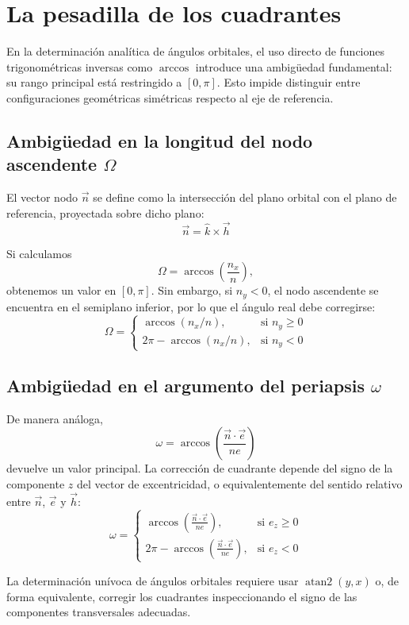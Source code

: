 \section{La pesadilla de los cuadrantes}
En la determinación analítica de ángulos orbitales, el uso directo de funciones trigonométricas inversas como \(\arccos\) introduce una ambigüedad fundamental: su rango principal está restringido a \([0,\pi]\). Esto impide distinguir entre configuraciones geométricas simétricas respecto al eje de referencia.

\subsection{Ambigüedad en la longitud del nodo ascendente \texorpdfstring{$\Omega$}{Omega}}
El vector nodo \(\vec{n}\) se define como la intersección del plano orbital con el plano de referencia, proyectada sobre dicho plano:
\[
\vec{n} = \hat{k} \times \vec{h}
\]

Si calculamos
\[
\Omega = \arccos\left(\frac{n_x}{n}\right),
\]
obtenemos un valor en \([0,\pi]\). Sin embargo, si \(n_y < 0\), el nodo ascendente se encuentra en el semiplano inferior, por lo que el ángulo real debe corregirse:
\[
\Omega =
\begin{cases}
\arccos(n_x/n), & \text{si } n_y \ge 0 \\
2\pi - \arccos(n_x/n), & \text{si } n_y < 0
\end{cases}
\]

\subsection{Ambigüedad en el argumento del periapsis \texorpdfstring{$\omega$}{omega}}
De manera análoga,
\[
\omega = \arccos\left(\frac{\vec{n}\cdot\vec{e}}{ne}\right)
\]
devuelve un valor principal. La corrección de cuadrante depende del signo de la componente \(z\) del vector de excentricidad, o equivalentemente del sentido relativo entre \(\vec{n}\), \(\vec{e}\) y \(\vec{h}\):
\[
\omega =
\begin{cases}
\arccos\left(\frac{\vec{n}\cdot\vec{e}}{ne}\right), & \text{si } e_z \ge 0 \\
2\pi - \arccos\left(\frac{\vec{n}\cdot\vec{e}}{ne}\right), & \text{si } e_z < 0
\end{cases}
\]

\begin{importante}
La determinación unívoca de ángulos orbitales requiere usar \(\operatorname{atan2}(y,x)\) o, de forma equivalente, corregir los cuadrantes inspeccionando el signo de las componentes transversales adecuadas.
\end{importante}

